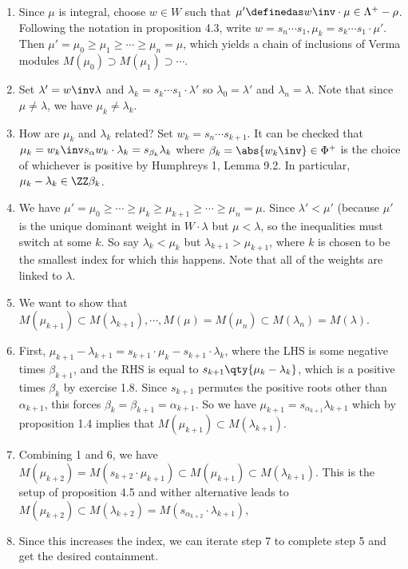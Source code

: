 \begin{enumerate}
\def\labelenumi{\arabic{enumi}.}
\item
  Since \(\mu\) is integral, choose \(w\in W\) such that
  \(\mu' \definedas w\inv \cdot \mu \in \Lambda^+ - \rho\). Following
  the notation in proposition 4.3, write
  \(w = s_n \cdots s_1, \mu_k = s_k \cdots s_1 \cdot \mu'\). Then
  \(\mu' = \mu_0 \geq \mu_1 \geq \cdots \geq \mu_n = \mu\), which yields
  a chain of inclusions of Verma modules
  \(M(\mu_0) \supset M(\mu_1) \supset \cdots\).
\item
  Set \(\lambda' = w\inv \lambda\) and
  \(\lambda_k = s_k \cdots s_1 \cdot \lambda'\) so
  \(\lambda_0 = \lambda'\) and \(\lambda_n = \lambda\). Note that since
  \(\mu \neq \lambda\), we have \(\mu_k \neq \lambda_k\).
\item
  How are \(\mu_k\) and \(\lambda_k\) related? Set
  \(w_k = s_n \cdots s_{k+1}\). It can be checked that
  \(\mu_k = w_k\inv s_\alpha w_k \cdot \lambda_k = s_{\beta_k} \lambda_k\)
  where \(\beta_k = \abs{w_k\inv} \in \Phi^+\) is the choice of
  whichever is positive by Humphreys 1, Lemma 9.2. In particular,
  \(\mu_k - \lambda_k \in \ZZ \beta_k\).
\item
  We have
  \(\mu' = \mu_0 \geq \cdots \geq \mu_k \geq \mu_{k+1} \geq \cdots \geq \mu_n = \mu\).
  Since \(\lambda'<\mu'\) (because \(\mu'\) is the unique dominant
  weight in \(W\cdot \lambda\) but \(\mu < \lambda\), so the
  inequalities must switch at some \(k\). So say \(\lambda_k < \mu_k\)
  but \(\lambda_{k+1} > \mu_{k+1}\), where \(k\) is chosen to be the
  smallest index for which this happens. Note that all of the weights
  are linked to \(\lambda\).
\item
  We want to show that
  \(M(\mu_{k+1}) \subset M(\lambda_{k+1}), \cdots, M(\mu) = M(\mu_n) \subset M(\lambda_n) = M(\lambda)\).
\item
  First,
  \(\mu_{k+1} - \lambda_{k+1} = s_{k+1} \cdot \mu_k - s_{k+1} \cdot \lambda_k\),
  where the LHS is some negative times \(\beta_{k+1}\), and the RHS is
  equal to \(s_{k+1} \qty{ \mu_k - \lambda_k }\), which is a positive
  times \(\beta_k\) by exercise 1.8. Since \(s_{k+1}\) permutes the
  positive roots other than \(\alpha_{k+1}\), this forces
  \(\beta_k = \beta_{k+1} = \alpha_{k+1}\). So we have
  \(\mu_{k+1} = s_{\alpha_{k+1}} \lambda_{k+1}\) which by proposition
  1.4 implies that \(M(\mu_{k+1}) \subset M(\lambda_{k+1})\).
\item
  Combining 1 and 6, we have
  \(M(\mu_{k+2}) = M(s_{k+2} \cdot \mu_{k+1}) \subset M(\mu_{k+1}) \subset M(\lambda_{k+1})\).
  This is the setup of proposition 4.5 and wither alternative leads to
  \(M(\mu_{k+2}) \subset M(\lambda_{k+2}) = M(s_{\alpha_{k+2}} \cdot \lambda_{k+1})\),
\item
  Since this increases the index, we can iterate step 7 to complete step
  5 and get the desired containment.
\end{enumerate}

